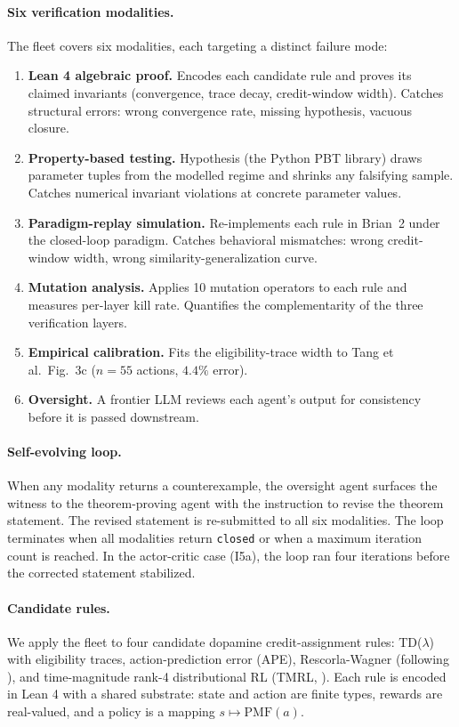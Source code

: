 \paragraph{Six verification modalities.}
The fleet covers six modalities, each targeting a distinct failure
mode:
\begin{enumerate}[leftmargin=1.5em,itemsep=0.1em]
\item \textbf{Lean 4 algebraic proof.} Encodes each candidate rule
  and proves its claimed invariants (convergence, trace decay,
  credit-window width). Catches structural errors: wrong convergence
  rate, missing hypothesis, vacuous closure.
\item \textbf{Property-based testing.} Hypothesis (the Python PBT
  library) draws parameter tuples from the modelled regime and shrinks
  any falsifying sample. Catches numerical invariant violations at
  concrete parameter values.
\item \textbf{Paradigm-replay simulation.} Re-implements each rule
  in Brian~2 under the \citet{tang2024dynamic} closed-loop paradigm.
  Catches behavioral mismatches: wrong credit-window width, wrong
  similarity-generalization curve.
\item \textbf{Mutation analysis.} Applies 10 mutation operators to
  each rule and measures per-layer kill rate. Quantifies the
  complementarity of the three verification layers.
\item \textbf{Empirical calibration.} Fits the eligibility-trace
  width to Tang et al.\ Fig.~3c ($n=55$ actions, $4.4\%$ error).
\item \textbf{Oversight.} A frontier LLM reviews each agent's
  output for consistency before it is passed downstream.
\end{enumerate}

\paragraph{Self-evolving loop.}
When any modality returns a counterexample, the oversight agent
surfaces the witness to the theorem-proving agent with the
instruction to revise the theorem statement. The revised statement
is re-submitted to all six modalities. The loop terminates when
all modalities return \texttt{closed} or when a maximum iteration
count is reached. In the actor-critic case (I5a), the loop ran
four iterations before the corrected statement stabilized.

\paragraph{Candidate rules.}
We apply the fleet to four candidate dopamine credit-assignment
rules: TD($\lambda$) with eligibility traces, action-prediction
error (APE), Rescorla-Wagner (following \citet{markowitz2023spontaneous}),
and time-magnitude rank-4 distributional RL (TMRL,
\citet{sousa2025tmrl}). Each rule is encoded in Lean 4 with a
shared substrate: state and action are finite types, rewards are
real-valued, and a policy is a mapping $s \mapsto \mathrm{PMF}(a)$.
